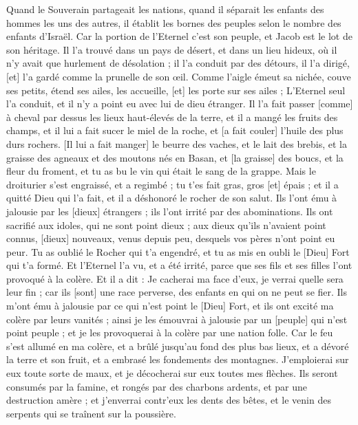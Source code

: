 \begin{multicols}{2}
Quand le Souverain partageait les nations, quand il séparait les enfants des hommes les uns des autres, il établit les bornes des peuples selon le nombre des enfants d'Israël.
Car la portion de l'Eternel c'est son peuple, et Jacob est le lot de son héritage.
Il l'a trouvé dans un pays de désert, et dans un lieu hideux, où il n'y avait que hurlement de désolation ; il l'a conduit par des détours, il l'a dirigé, [et] l'a gardé comme la prunelle de son œil.
Comme l'aigle émeut sa nichée, couve ses petits, étend ses ailes, les accueille, [et] les porte sur ses ailes ;
L'Eternel seul l'a conduit, et il n'y a point eu avec lui de dieu étranger.
Il l'a fait passer [comme] à cheval par dessus les lieux haut-élevés de la terre, et il a mangé les fruits des champs, et il lui a fait sucer le miel de la roche, et [a fait couler] l'huile des plus durs rochers.
[Il lui a fait manger] le beurre des vaches, et le lait des brebis, et la graisse des agneaux et des moutons nés en Basan, et [la graisse] des boucs, et la fleur du froment, et tu as bu le vin qui était le sang de la grappe.
Mais le droiturier s'est engraissé, et a regimbé ; tu t'es fait gras, gros [et] épais ; et il a quitté Dieu qui l'a fait, et il a déshonoré le rocher de son salut.
Ils l'ont ému à jalousie par les [dieux] étrangers ; ils l'ont irrité par des abominations.
Ils ont sacrifié aux idoles, qui ne sont point dieux ; aux dieux qu'ils n'avaient point connus, [dieux] nouveaux, venus depuis peu, desquels vos pères n'ont point eu peur.
Tu as oublié le Rocher qui t'a engendré, et tu as mis en oubli le [Dieu] Fort qui t'a formé.
Et l'Eternel l'a vu, et a été irrité, parce que ses fils et ses filles l'ont provoqué à la colère.
Et il a dit : Je cacherai ma face d'eux, je verrai quelle sera leur fin ; car ils [sont] une race perverse, des enfants en qui on ne peut se fier.
Ils m'ont ému à jalousie par ce qui n'est point le [Dieu] Fort, et ils ont excité ma colère par leurs vanités ; ainsi je les émouvrai à jalousie par un [peuple] qui n'est point peuple ; et je les provoquerai à la colère par une nation folle.
Car le feu s'est allumé en ma colère, et a brûlé jusqu'au fond des plus bas lieux, et a dévoré la terre et son fruit, et a embrasé les fondements des montagnes.
J'emploierai sur eux toute sorte de maux, et je décocherai sur eux toutes mes flèches.
Ils seront consumés par la famine, et rongés par des charbons ardents, et par une destruction amère ; et j'enverrai contr'eux les dents des bêtes, et le venin des serpents qui se traînent sur la poussière.

\end{multicols}

